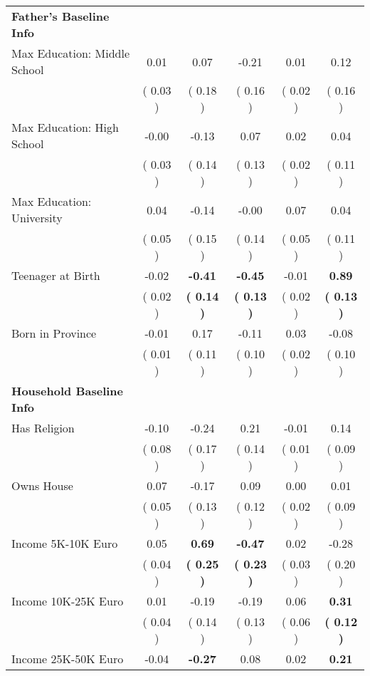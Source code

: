 \begin{table}[H]
{\begin{tabular}{lccccc}
\midrule
\textbf{Father's Baseline Info} \\
\quad Max Education: Middle School &      0.01 &      0.07 &     -0.21 &      0.01 &      0.12 \\
\quad  & (     0.03 ) & (     0.18 )  & (     0.16 )  & (     0.02 ) & (     0.16 ) \\
\quad Max Education: High School &     -0.00 &     -0.13 &      0.07 &      0.02 &      0.04 \\
\quad  & (     0.03 ) & (     0.14 )  & (     0.13 )  & (     0.02 ) & (     0.11 ) \\
\quad Max Education: University &      0.04 &     -0.14 &     -0.00 &      0.07 &      0.04 \\
\quad  & (     0.05 ) & (     0.15 )  & (     0.14 )  & (     0.05 ) & (     0.11 ) \\
\quad Teenager at Birth &     -0.02 & \textbf{    -0.41} & \textbf{    -0.45} &     -0.01 & \textbf{     0.89} \\
\quad  & (     0.02 ) & \textbf{(     0.14 )}  & \textbf{(     0.13 )}  & (     0.02 ) & \textbf{(     0.13 )} \\
\quad Born in Province &     -0.01 &      0.17 &     -0.11 &      0.03 &     -0.08 \\
\quad  & (     0.01 ) & (     0.11 )  & (     0.10 )  & (     0.02 ) & (     0.10 ) \\
\midrule
\textbf{Household Baseline Info} \\
\quad Has Religion &     -0.10 &     -0.24 &      0.21 &     -0.01 &      0.14 \\
\quad  & (     0.08 ) & (     0.17 )  & (     0.14 )  & (     0.01 ) & (     0.09 ) \\
\quad Owns House &      0.07 &     -0.17 &      0.09 &      0.00 &      0.01 \\
\quad  & (     0.05 ) & (     0.13 )  & (     0.12 )  & (     0.02 ) & (     0.09 ) \\
\quad Income 5K-10K Euro &      0.05 & \textbf{     0.69} & \textbf{    -0.47} &      0.02 &     -0.28 \\
\quad  & (     0.04 ) & \textbf{(     0.25 )}  & \textbf{(     0.23 )}  & (     0.03 ) & (     0.20 ) \\
\quad Income 10K-25K Euro &      0.01 &     -0.19 &     -0.19 &      0.06 & \textbf{     0.31} \\
\quad  & (     0.04 ) & (     0.14 )  & (     0.13 )  & (     0.06 ) & \textbf{(     0.12 )} \\
\quad Income 25K-50K Euro &     -0.04 & \textbf{    -0.27} &      0.08 &      0.02 & \textbf{     0.21} \\

\end{tabular}}
\end{table}
